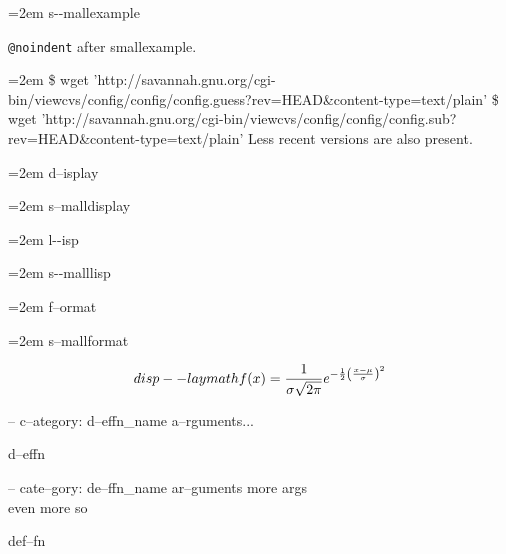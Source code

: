 \documentclass{book}
\begin{document}
\begin{titlepage}
\par\begingroup\obeylines\obeyspaces\frenchspacing\leftskip=2em\relax\parskip=0pt\relax\ttfamily\footnotesize{}%
s{-}{-}mallexample
\endgroup{}%

\texttt{@noindent} after smallexample.
\par\begingroup\obeylines\obeyspaces\frenchspacing\leftskip=2em\relax\parskip=0pt\relax\ttfamily\footnotesize{}%
\$ wget 'http://savannah.gnu.org/cgi-bin/viewcvs/config/config/config.guess?rev=HEAD\&content-type=text/plain'
\$ wget 'http://savannah.gnu.org/cgi-bin/viewcvs/config/config/config.sub?rev=HEAD\&content-type=text/plain'
\endgroup{}%
\noindent{}Less recent versions are also present.

\par\begingroup\obeylines\obeyspaces\frenchspacing\leftskip=2em\relax\parskip=0pt\relax{}%
d--isplay
\endgroup{}%

\par\begingroup\obeylines\obeyspaces\frenchspacing\leftskip=2em\relax\parskip=0pt\relax\footnotesize{}%
s--malldisplay
\endgroup{}%

\par\begingroup\obeylines\obeyspaces\frenchspacing\leftskip=2em\relax\parskip=0pt\relax\ttfamily{}%
l{-}{-}isp
\endgroup{}%

\par\begingroup\obeylines\obeyspaces\frenchspacing\leftskip=2em\relax\parskip=0pt\relax\ttfamily\footnotesize{}%
s{-}{-}malllisp
\endgroup{}%

\par\begingroup\obeylines\obeyspaces\frenchspacing\leftskip=2em\relax\parskip=0pt\relax{}%
f--ormat
\endgroup{}%

\par\begingroup\obeylines\obeyspaces\frenchspacing\leftskip=2em\relax\parskip=0pt\relax\footnotesize{}%
s--mallformat
\endgroup{}%

$$
disp--laymath
f(x) = {1 \over \sigma \sqrt{2\pi}}e^{-{1 \over 2}\left({x-\mu \over \sigma}\right)^2}
$$

\hbox{}-- c--ategory: d--effn\_name a--rguments...


%
d--effn

\hbox{}-- cate--gory: de--ffn\_name ar--guments    more args \leavevmode{}\\ even more so


%
def--fn


\end{titlepage}
\end{document}
